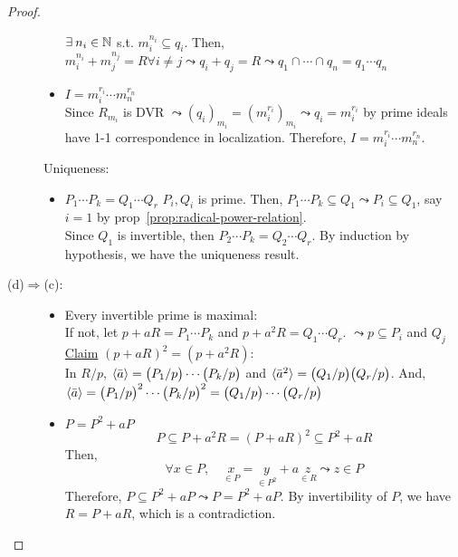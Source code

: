 \begin{theorem}
\begin{proof}
\begin{description}
\begin{itemize}
            $\exists n_i \in \Nb$ s.t. $m_i^{n_i} \subseteq q_i$. Then,
            $m_i^{n_i} + m_j^{n_j} = R \forall i \neq
            j \leadsto q_i + q_j  = R \leadsto q_1 \cap \cdots \cap q_n = q_1 \cdots
             q_n$
           \item $I = m_i^{r_i} \cdots m_n^{r_n}$ \\
             Since $R_{m_i}$ is DVR $\leadsto (q_i)_{m_i} = (m_i^{r_i})_{m_i} \leadsto
              q_i = m_i^{r_i}$ by prime ideals have 1-1 correspondence in localization. 
              Therefore,  $I = m_i^{r_i} \cdots m_n^{r_n}$. 
        \end{itemize}
        Uniqueness: 
        \begin{itemize}
          \item $P_1\cdots P_k = Q_1\cdots Q_r$ $P_i, Q_i$ is prime. Then, $P_1\cdots
             P_k \subseteq Q_1 \leadsto P_i \subseteq Q_1$, say $i = 1$ by 
             prop~\ref{prop:radical-power-relation}. \\
             Since $Q_1$ is invertible, then $P_2\cdots P_k = Q_2\cdots Q_r$. By 
             induction by hypothesis, we have the uniqueness result.
        \end{itemize}
      \item[\rm (d)$\Rightarrow$(c):] \mbox{}
        \begin{itemize}
          \item Every invertible prime is maximal: \\
            If not, let $p + aR = P_1 \cdots P_k$ and $p + a^2R = Q_1 \cdots Q_r$. 
            $\leadsto p \subseteq P_i$ and $Q_j$\\
            \underline{Claim} $(p + aR)^2 = (p + a^2R)$: \\
            In $R/p$, $\langle\bar{a}\rangle = \big(P_1/p\big) \cdots \big(P_k/p\big)$ and 
            $\langle\bar{a}^2\rangle= \big(Q_1/p\big)\big(Q_r/p\big)$. And, $\langle\bar{a}\rangle
             = \big(P_1/p\big)^2 \cdots \big(P_k/p\big)^2 = \big(Q_1/p\big) \cdots
             \big(Q_r/p\big)$
          \item $P = P^2 + aP$
             $$
             P \subseteq P + a^2R = (P + aR)^2 \subseteq P^2 + aR
             $$
             Then,
             $$
             \forall x \in P, \quad \underset{\in P}{x} = \underset{\in P^2}{y}
             + a\underset{\in R}{z} \leadsto z \in P
             $$
             Therefore, $P\subseteq P^2 + aP \leadsto P = P^2 + aP$. 
        By invertibility of $P$, we have $R = P + aR$, which is a contradiction.

\end{itemize}
\end{description}
\end{proof}
\end{theorem}
